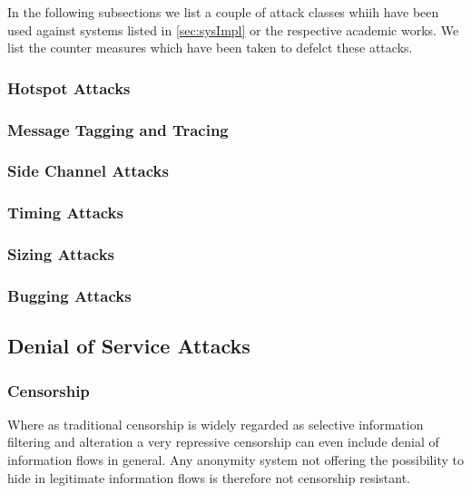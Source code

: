 In the following subsections we list a couple of attack classes whiih have been used against systems listed in \ref{sec:sysImpl} or the respective academic works. We list the counter measures which have been taken to defelct these attacks.

\subsubsection{Hotspot Attacks}

\subsubsection{Message Tagging and Tracing}

\subsubsection{Side Channel Attacks}

\subsubsection{Timing Attacks}

\subsubsection{Sizing Attacks}

\subsubsection{Bugging Attacks}

\subsection{Denial of Service Attacks}
\subsubsection{Censorship}
Where as traditional censorship is widely regarded as selective information filtering and alteration a very repressive censorship can even include denial of information flows in general. Any anonymity system not offering the possibility to hide in legitimate information flows is therefore not censorship resistant.

